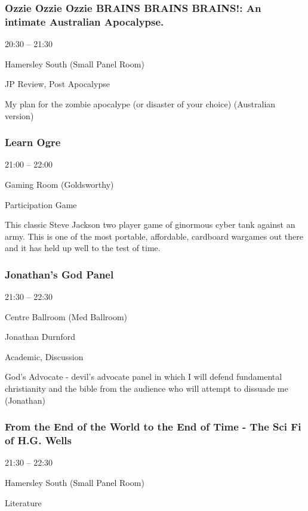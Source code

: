 \documentclass{scrreprt}
\begin{document}
\begin{multicols}{2}
\subsubsection*{Ozzie Ozzie Ozzie BRAINS BRAINS BRAINS!: An intimate Australian Apocalypse.}\begin{description}
\setlength{\itemsep}{0pt}
\setlength{\parsep}{0pt}
\setlength{\parskip}{0pt}
\item[Time:]{20:30 -- 21:30}
\item[Venue:]{Hamersley South (Small Panel Room)}
\item[Tags:]{JP Review, Post Apocalypse}\end{description}
My plan for the zombie apocalype (or disaster of your choice) (Australian version)
\subsubsection*{Learn Ogre}\begin{description}
\setlength{\itemsep}{0pt}
\setlength{\parsep}{0pt}
\setlength{\parskip}{0pt}
\item[Time:]{21:00 -- 22:00}
\item[Venue:]{Gaming Room (Goldsworthy)}
\item[Tags:]{Participation Game}\end{description}
This classic Steve Jackson two player game of ginormous cyber tank against an army. This is one of the most portable, affordable, cardboard wargames out there and it has held up well to the test of time.
\subsubsection*{Jonathan's God Panel}\begin{description}
\setlength{\itemsep}{0pt}
\setlength{\parsep}{0pt}
\setlength{\parskip}{0pt}
\item[Time:]{21:30 -- 22:30}
\item[Venue:]{Centre Ballroom (Med Ballroom)}
\item[People:]{Jonathan Durnford}
\item[Tags:]{Academic, Discussion}\end{description}
God’s Advocate - devil’s advocate panel in which I will defend fundamental christianity and the bible from the audience who will attempt to dissuade me (Jonathan)
\subsubsection*{From the End of the World to the End of Time - The Sci Fi of H.G. Wells}\begin{description}
\setlength{\itemsep}{0pt}
\setlength{\parsep}{0pt}
\setlength{\parskip}{0pt}
\item[Time:]{21:30 -- 22:30}
\item[Venue:]{Hamersley South (Small Panel Room)}
\item[Tags:]{Literature}\end{description}


\end{multicols}
\end{document}
